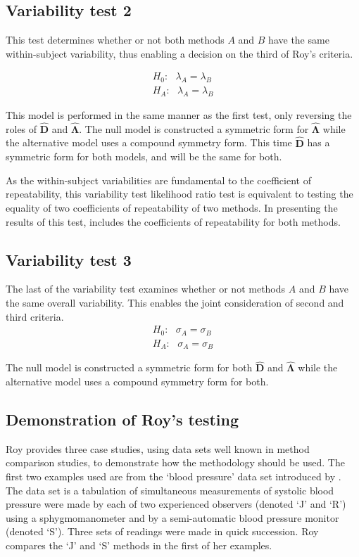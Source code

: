 \documentclass[12pt, a4paper]{report}
\theoremstyle{plain}
\theoremstyle{definition}
\theoremstyle{remark}
\begin{document}
\subsection{Variability test 2}

This test determines whether or not both methods $A$ and $B$ have the same within-subject variability, thus enabling a decision on the third of Roy's criteria.

\begin{eqnarray*}
H_{0}: \mbox{ }\lambda_{A}  = \lambda_{B} \\
H_{A}: \mbox{ }\lambda_{A}  = \lambda_{B}
\end{eqnarray*}

This model is performed in the same manner as the first test, only reversing the roles of $\boldsymbol{\hat{D}}$ and $\boldsymbol{\hat{\Lambda}}$. The null model is constructed a symmetric form for $\boldsymbol{\hat{\Lambda}}$ while the alternative model uses a compound symmetry form. This time $\boldsymbol{\hat{D}}$ has a symmetric form for both models, and will be the same for both.

As the within-subject variabilities are fundamental to the coefficient of repeatability, this variability test likelihood ratio test is equivalent to testing the equality of two coefficients of repeatability of two methods. In presenting the results of this test, \citet{roy} includes the coefficients of repeatability for both methods.

\subsection{Variability test 3}
The last of the variability test examines whether or not methods $A$ and $B$ have the same overall variability. This enables the joint consideration of second and third criteria.
\begin{eqnarray*}
H_{0}: \mbox{ }\sigma_{A}  = \sigma_{B} \\
H_{A}: \mbox{ }\sigma_{A}  = \sigma_{B}
\end{eqnarray*}

The null model is constructed a symmetric form for both $\boldsymbol{\hat{D}}$ and $\boldsymbol{\hat{\Lambda}}$ while the alternative model uses a compound symmetry form for both.

\subsection{Demonstration of Roy's testing}
Roy provides three case studies, using data sets well known in method comparison studies, to demonstrate how the methodology should be used. The first two examples used are from the `blood pressure' data set introduced by \citet{BA99}. The data set is a tabulation of simultaneous measurements of systolic blood pressure were made by each of two experienced observers (denoted `J' and `R') using a sphygmomanometer and by a semi-automatic blood pressure monitor (denoted `S'). Three sets of readings were made in quick succession. Roy compares the `J' and `S' methods in the first of her examples.
\end{document}
